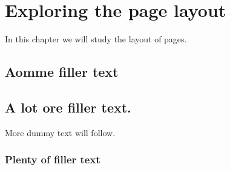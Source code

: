 \documentclass[a4paper, 12pt]{article}
\begin{document}
\chapter{Exploring the page layout}
In this chapter we will study the layout of pages.
\section{Aomme filler text}
\blindtext
\section{A lot ore filler text.}
More dummy text will follow.
\subsection{Plenty of filler text}
\blindtext[10]
\end{document}
